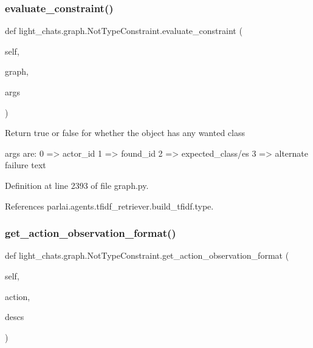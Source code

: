 \subsubsection{\texorpdfstring{evaluate\+\_\+constraint()}{evaluate\_constraint()}}
{\footnotesize\ttfamily def light\+\_\+chats.\+graph.\+Not\+Type\+Constraint.\+evaluate\+\_\+constraint (\begin{DoxyParamCaption}\item[{}]{self,  }\item[{}]{graph,  }\item[{}]{args }\end{DoxyParamCaption})}

\begin{DoxyVerb}Return true or false for whether the object has any wanted class

args are:
    0 => actor_id
    1 => found_id
    2 => expected_class/es
    3 => alternate failure text
\end{DoxyVerb}
 

Definition at line 2393 of file graph.\+py.



References parlai.\+agents.\+tfidf\+\_\+retriever.\+build\+\_\+tfidf.\+type.

\mbox{\label{classlight__chats_1_1graph_1_1NotTypeConstraint_a5676df24e75c1823bd7b555a266de5f3}} 
\subsubsection{\texorpdfstring{get\+\_\+action\+\_\+observation\+\_\+format()}{get\_action\_observation\_format()}}
{\footnotesize\ttfamily def light\+\_\+chats.\+graph.\+Not\+Type\+Constraint.\+get\+\_\+action\+\_\+observation\+\_\+format (\begin{DoxyParamCaption}\item[{}]{self,  }\item[{}]{action,  }\item[{}]{descs }\end{DoxyParamCaption})}




